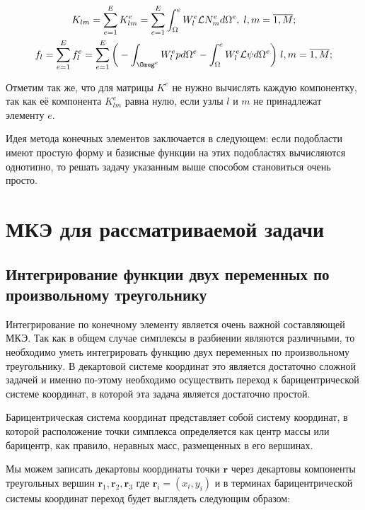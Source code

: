 \documentclass[14pt]{extreport}
\begin{document}
\begin{gather}
	K_{lm}=\sum\limits_{e=1}^{E} K_{lm}^{e}=\sum\limits_{e=1}^{E}\int_\Omega^{e} W_l^{e} \mathcal L N_{m}^{e}  d\Omega^{e}, \; l,m=\overline{1,M}; \\
f_l=\sum\limits_{e=1}^{E} f_{l}^{e}=\sum\limits_{e=1}^{E} \bigg(-\int_{\Omeg^{e}} W_{l}^{e} p d \Omega^{e} -\int_\Omega^{e} W_{l}^{e} \mathcal L \psi d \Omega^{e}\bigg) \; l,m=\overline{1,M};
\end{gather}



Отметим так же, что для матрицы $K^{e}$ не нужно вычислять каждую компонентку, так как её компонента $K_{lm}^{e}$ равна нулю, если узлы $l$ и $m$ не принадлежат элементу $e$. 

Идея метода конечных элементов заключается в следующем: если подобласти имеют простую форму и базисные функции на этих подобластях вычисляются однотипно, то решать задачу указанным выше способом становиться очень просто. 


\section{МКЭ для рассматриваемой задачи}


\subsection{Интегрирование функции двух переменных по произвольному треугольнику}

Интегрирование по конечному элементу является очень важной составляющей МКЭ. Так как в общем случае симплексы в разбиении являются различными, то необходимо уметь интегрировать функцию двух переменных по произвольному треугольнику. В декартовой системе координат это является достаточно сложной задачей и именно по-этому необходимо осуществить переход к барицентрической системе координат, в которой эта задача является достаточно простой.

Барицентрическая система координат представляет собой систему координат, в которой расположение точки симплекса определяется как центр массы или барицентр, как правило, неравных масс, размещенных в его вершинах. 

Мы можем записать декартовы координаты точки $\mathbf{r}$ через декартовы компоненты треугольных вершин $\mathbf{r}_1, \mathbf{r}_2, \mathbf{r}_3$ где $\mathbf{r}_i = (x_i, y_i)$  и в терминах барицентрической системы координат переход будет выглядеть следующим образом:
\end{document}
